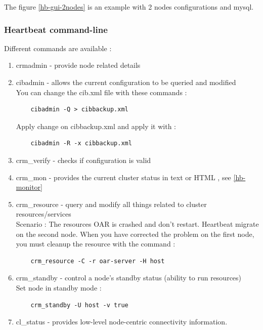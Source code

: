 \documentclass[a4paper,10pt]{report}
\begin{document}
The figure \ref{hb-gui-2nodes} is an example with 2 nodes configurations and mysql.

\subsubsection{Heartbeat command-line}
\label{hb-command}
Different commands are available : 
\begin{enumerate}
 \item crmadmin - provide node related details 
 \item cibadmin - allows the current configuration to be queried and modified \\
    You can change the cib.xml file with these commands :
    \begin{lstlisting}
    cibadmin -Q > cibbackup.xml 
    \end{lstlisting}
  Apply change on cibbackup.xml and apply it with :
    \begin{lstlisting}
    cibadmin -R -x cibbackup.xml 
    \end{lstlisting}

 \item crm\_verify - checks if configuration is valid 
 \item crm\_mon - provides the current cluster status in text or HTML , see \ref{hb-monitor}
 \item crm\_resource - query and modify all things related to cluster resources/services\\
    Scenario : The resources OAR is crashed and don't restart. Heartbeat migrate on the second node. When you have corrected the problem on the first node, you must cleanup the resource with the command :
    \begin{lstlisting}
    crm_resource -C -r oar-server -H host
    \end{lstlisting}
 \item crm\_standby - control a node's standby status (ability to run resources) \\
    Set node in standby mode :
    \begin{lstlisting}
    crm_standby -U host -v true 
    \end{lstlisting}
 \item cl\_status - provides low-level node-centric connectivity information. 
\end{enumerate}
\end{document}
